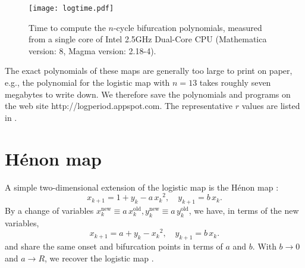 \documentclass{ws-ijbc}
\begin{document}
\begin{figure}[h]
  \begin{center}
  \begin{minipage}{\linewidth}
        \texttt{[image: logtime.pdf]}
  \end{minipage}%
  \end{center}
  \caption{\label{fig:logtime}
  Time to compute the $n$-cycle bifurcation polynomials,
    measured from a single core of
    Intel\textsuperscript{\textregistered} 2.5GHz Dual-Core CPU
  (Mathematica version: 8, Magma version: 2.18-4).
  }
\end{figure}
%






%
The exact polynomials of these maps are generally too large to print on paper,
  e.g., the polynomial for the logistic map with $n = 13$
    takes roughly seven megabytes to write down.
%
We therefore save the polynomials and programs on the web site
http://logperiod.appspot.com.
%
The representative $r$ values are listed in .






\section{\label{sec:henon}H\'enon map}




A simple two-dimensional extension of the logistic map
  is the H\'enon map \cite{henon}:
\begin{equation}
  x_{k+1} = 1 + y_k - a \, {x_k}^2, \quad
  y_{k+1} = b \, x_k.
\label{eq:henon}
\end{equation}
%
By a change of variables \cite{huang}
  $x_k^\mathrm{new} \equiv a \, x_k^\mathrm{old},
   y_k^\mathrm{new} \equiv a \, y_k^\mathrm{old}$,
we have, in terms of the new variables,
\begin{equation}
  x_{k+1} = a + y_k - {x_k}^2, \quad
  y_{k+1} = b \, x_k.
\label{eq:henons}
\end{equation}
%
 and  share the
same onset and bifurcation points
in terms of $a$ and $b$.
%
With $b \rightarrow 0$ and $a \rightarrow R$,
we recover the logistic map .
\end{document}
